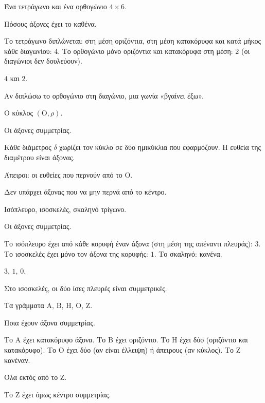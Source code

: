 
\tixero Ένα τετράγωνο και ένα ορθογώνιο $4\times6$.\par
\tithelo Πόσους άξονες έχει το καθένα.\par
\possindeo Το τετράγωνο διπλώνεται: στη μέση οριζόντια, στη μέση κατακόρυφα και κατά μήκος κάθε διαγωνίου: $4$. Το ορθογώνιο μόνο οριζόντια και κατακόρυφα στη μέση: $2$ (οι διαγώνιοι δεν δουλεύουν).\par
\apantisi $4$ και $2$.\par
\elegxos Αν διπλώσω το ορθογώνιο στη διαγώνιο, μια γωνία «βγαίνει έξω».

\tixero Ο κύκλος $(\mathrm{Ο},\rho)$.\par
\tithelo Οι άξονες συμμετρίας.\par
\possindeo Κάθε διάμετρος $\delta$ χωρίζει τον κύκλο σε δύο ημικύκλια που εφαρμόζουν. Η ευθεία της διαμέτρου είναι άξονας.\par
\apantisi Άπειροι: οι ευθείες που περνούν από το $\mathrm{Ο}$.\par
\elegxos Δεν υπάρχει άξονας που να μην περνά από το κέντρο.

\tixero Ισόπλευρο, ισοσκελές, σκαληνό τρίγωνο.\par
\tithelo Οι άξονες συμμετρίας.\par
\possindeo Το ισόπλευρο έχει από κάθε κορυφή έναν άξονα (στη μέση της απέναντι πλευράς): $3$. Το ισοσκελές έχει μόνο τον άξονα της κορυφής: $1$. Το σκαληνό: κανένα.\par
\apantisi $3$, $1$, $0$.\par
\elegxos Στο ισοσκελές, οι δύο ίσες πλευρές είναι συμμετρικές.

\tixero Τα γράμματα $\mathrm{Α}$, $\mathrm{Β}$, $\mathrm{Η}$, $\mathrm{Ο}$, $\mathrm{Ζ}$.\par
\tithelo Ποια έχουν άξονα συμμετρίας.\par
\possindeo Το $\mathrm{Α}$ έχει κατακόρυφο άξονα. Το $\mathrm{Β}$ έχει οριζόντιο. Το $\mathrm{Η}$ έχει δύο (οριζόντιο και κατακόρυφο). Το $\mathrm{Ο}$ έχει δύο (αν είναι έλλειψη) ή άπειρους (αν κύκλος). Το $\mathrm{Ζ}$ κανέναν.\par
\apantisi Όλα εκτός από το $\mathrm{Ζ}$.\par
\elegxos Το $\mathrm{Ζ}$ έχει όμως κέντρο συμμετρίας.



